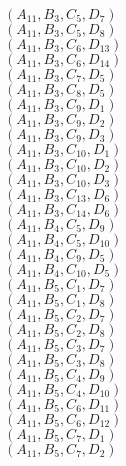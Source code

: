 \documentclass[14pt]{article}
\begin{document}
    $({A}_{11}, {B}_{3}, {C}_{5}, {D}_{7}) $ \\ 
    $({A}_{11}, {B}_{3}, {C}_{5}, {D}_{8}) $ \\ 
    $({A}_{11}, {B}_{3}, {C}_{6}, {D}_{13}) $ \\ 
    $({A}_{11}, {B}_{3}, {C}_{6}, {D}_{14}) $ \\ 
    $({A}_{11}, {B}_{3}, {C}_{7}, {D}_{5}) $ \\ 
    $({A}_{11}, {B}_{3}, {C}_{8}, {D}_{5}) $ \\ 
    $({A}_{11}, {B}_{3}, {C}_{9}, {D}_{1}) $ \\ 
    $({A}_{11}, {B}_{3}, {C}_{9}, {D}_{2}) $ \\ 
    $({A}_{11}, {B}_{3}, {C}_{9}, {D}_{3}) $ \\ 
    $({A}_{11}, {B}_{3}, {C}_{10}, {D}_{1}) $ \\ 
    $({A}_{11}, {B}_{3}, {C}_{10}, {D}_{2}) $ \\ 
    $({A}_{11}, {B}_{3}, {C}_{10}, {D}_{3}) $ \\ 
    $({A}_{11}, {B}_{3}, {C}_{13}, {D}_{6}) $ \\ 
    $({A}_{11}, {B}_{3}, {C}_{14}, {D}_{6}) $ \\ 
    $({A}_{11}, {B}_{4}, {C}_{5}, {D}_{9}) $ \\ 
    $({A}_{11}, {B}_{4}, {C}_{5}, {D}_{10}) $ \\ 
    $({A}_{11}, {B}_{4}, {C}_{9}, {D}_{5}) $ \\ 
    $({A}_{11}, {B}_{4}, {C}_{10}, {D}_{5}) $ \\ 
    $({A}_{11}, {B}_{5}, {C}_{1}, {D}_{7}) $ \\ 
    $({A}_{11}, {B}_{5}, {C}_{1}, {D}_{8}) $ \\ 
    $({A}_{11}, {B}_{5}, {C}_{2}, {D}_{7}) $ \\ 
    $({A}_{11}, {B}_{5}, {C}_{2}, {D}_{8}) $ \\ 
    $({A}_{11}, {B}_{5}, {C}_{3}, {D}_{7}) $ \\ 
    $({A}_{11}, {B}_{5}, {C}_{3}, {D}_{8}) $ \\ 
    $({A}_{11}, {B}_{5}, {C}_{4}, {D}_{9}) $ \\ 
    $({A}_{11}, {B}_{5}, {C}_{4}, {D}_{10}) $ \\ 
    $({A}_{11}, {B}_{5}, {C}_{6}, {D}_{11}) $ \\ 
    $({A}_{11}, {B}_{5}, {C}_{6}, {D}_{12}) $ \\ 
    $({A}_{11}, {B}_{5}, {C}_{7}, {D}_{1}) $ \\ 
    $({A}_{11}, {B}_{5}, {C}_{7}, {D}_{2}) $ \\ 
\end{document}
